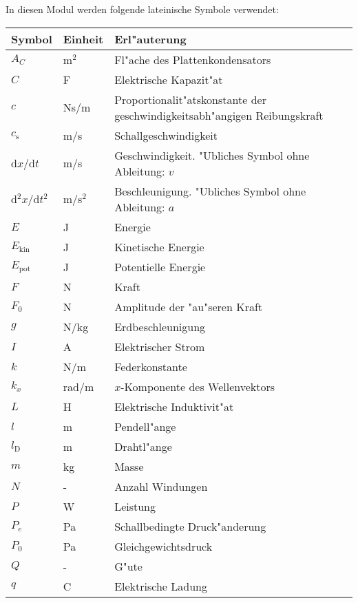 \begin{MSectionStart}
In diesen Modul werden folgende lateinische Symbole verwendet:\\
\begin{tabular}{|l|l|l|}
\hline
Symbol & Einheit & Erl"auterung \\\hline
  $A_C$  & m$^2$   & Fl"ache des Plattenkondensators \\\hline
  $C$    & F       & Elektrische Kapazit"at \\\hline
  $c$    & Ns/m    & Proportionalit"atskonstante der geschwindigkeitsabh"angigen Reibungskraft \\\hline
  $c_\mathrm{s}$ & m/s & Schallgeschwindigkeit \\\hline
  d$x$/d$t$     & m/s     & Geschwindigkeit. "Ubliches Symbol ohne Ableitung: $v$ \\\hline
  d$^2x$/d$t^2$ & m/s$^2$ & Beschleunigung. "Ubliches Symbol ohne Ableitung: $a$ \\\hline
  $E$    & J       & Energie \\\hline
  $E_\mathrm{kin}$ & J & Kinetische Energie \\\hline
  $E_\mathrm{pot}$ & J & Potentielle Energie \\\hline
  $F$    & N       & Kraft \\\hline
  $F_0$  & N       & Amplitude der "au"seren Kraft \\\hline
  $g$    & N/kg    & Erdbeschleunigung \\\hline
  $I$    & A       & Elektrischer Strom \\\hline
  $k$    & N/m     & Federkonstante \\\hline
  $k_x$  & rad/m   & $x$-Komponente des Wellenvektors \\\hline
  $L$    & H       & Elektrische Induktivit"at \\\hline
  $l$    & m       & Pendell"ange \\\hline
  $l_\mathrm{D}$ & m & Drahtl"ange \\\hline
  $m$    & kg      & Masse \\\hline
  $N$    & -       & Anzahl Windungen \\\hline
  $P$    & W       & Leistung \\\hline
  $P_e$  & Pa      & Schallbedingte Druck"anderung \\\hline
  $P_0$  & Pa      & Gleichgewichtsdruck \\\hline
  $Q$    & -       & G"ute \\\hline
  $q$    & C       & Elektrische Ladung \\\hline

\end{tabular}
\end{MSectionStart}
